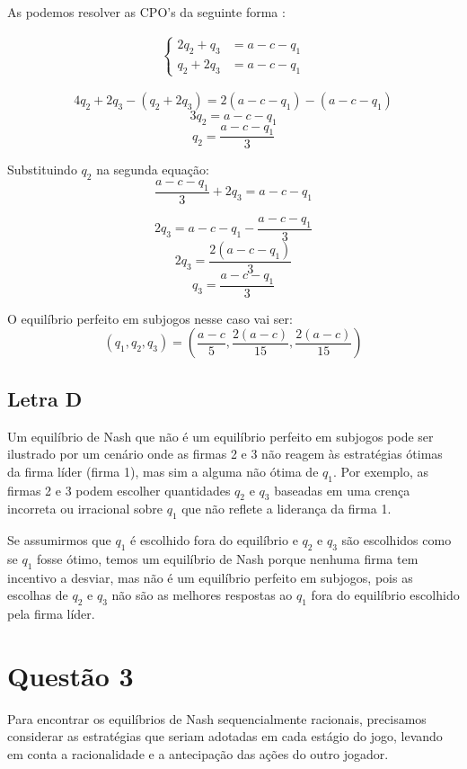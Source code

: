 \documentclass[a4paper,12pt]{article}[abntex2]
\begin{document}
As podemos resolver as CPO's da seguinte forma : 

\begin{align}
\left\{
\begin{array}{ll}
2q_2 + q_3 &= a - c - q_1 \\
q_2 + 2q_3 &= a - c - q_1
\end{array}
\right.
\end{align}


\[4q_2 + 2q_3 - (q_2 + 2q_3) = 2(a - c - q_1) - (a - c - q_1)\]
\[3q_2 = a - c - q_1\]
\[q_2 = \frac{a - c - q_1}{3}\]

Substituindo \(q_2\) na segunda equação:
\[\frac{a - c - q_1}{3} + 2q_3 = a - c - q_1\]

\[2q_3 = a - c - q_1 - \frac{a - c - q_1}{3}\]
\[2q_3 = \frac{2(a - c - q_1)}{3}\]
\[q_3 = \frac{a - c - q_1}{3}\]

O equilíbrio perfeito em subjogos nesse caso vai ser:
\[(q_1, q_2, q_3) = \left(\frac{a - c}{5}, \frac{2(a - c)}{15}, \frac{2(a - c)}{15}\right)\]

\subsection{\textbf{Letra D}}
Um equilíbrio de Nash que não é um equilíbrio perfeito em subjogos pode ser ilustrado por um cenário onde as firmas 2 e 3 não reagem às estratégias ótimas da firma líder (firma 1), mas sim a alguma não ótima de \( q_1 \). Por exemplo, as firmas 2 e 3 podem escolher quantidades \( q_2 \) e \( q_3 \) baseadas em uma crença incorreta ou irracional sobre \( q_1 \) que não reflete a liderança da firma 1.

Se assumirmos que \( q_1 \) é escolhido fora do equilíbrio e \( q_2 \) e \( q_3 \) são escolhidos como se \( q_1 \) fosse ótimo, temos um equilíbrio de Nash porque nenhuma firma tem incentivo a desviar, mas não é um equilíbrio perfeito em subjogos, pois as escolhas de \( q_2 \) e \( q_3 \) não são as melhores respostas ao \( q_1 \) fora do equilíbrio escolhido pela firma líder.

\section{\textbf{Questão 3}}
Para encontrar os equilíbrios de Nash sequencialmente racionais, precisamos considerar as estratégias que seriam adotadas em cada estágio do jogo, levando em conta a racionalidade e a antecipação das ações do outro jogador.
\end{document}
